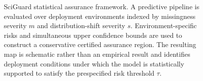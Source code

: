 \begin{figure}[!t]
{}
	
	\caption{SciGuard statistical assurance
		framework. A predictive pipeline is evaluated over deployment environments
		indexed by missingness severity $m$ and distribution-shift severity $s$.
		Environment-specific risks and simultaneous upper confidence bounds are used
		to construct a conservative certified assurance region. The resulting map
		is schematic rather than an empirical result and identifies deployment conditions under which the model is statistically
		supported to satisfy the prespecified risk threshold $\tau$.}
	\label{fig:sciguard-overview}
\end{figure}
